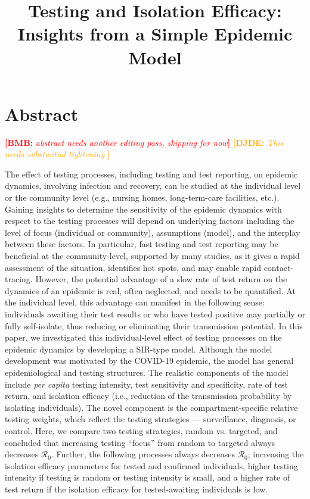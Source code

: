 \documentclass[12pt]{article}
\title{Testing and Isolation Efficacy:\\Insights from a Simple Epidemic Model}
\author{\david{??? authors ??? affiliations ???}}
\newcommand{\percap}{\emph{per capita}\xspace}
\newcommand{\Rnum}{\ensuremath{\mathcal{R}_0}\xspace}
\newcommand{\covid}{COVID-19\xspace}
\DeclareRobustCommand\_{\ifmmode\expandafter\subtxt\else\textunderscore\fi}
\newcommand{\comment}{\showcomment}
\newcommand{\showcomment}[3]{\textcolor{#1}{\textbf{[#2: }\textsl{#3}\textbf{]}}}
\newcommand{\david}[1]{\comment{orange}{DJDE}{#1}}
\newcommand{\bmb}[1]{\comment{red}{BMB}{#1}}
\theoremstyle{definition} %
\begin{document}
\maketitle

\linenumbers

\section{Abstract}

\bmb{abstract needs another editing pass, skipping for now}
\david{This needs substantial tightening.}

The effect of testing processes, including testing and test reporting, on epidemic dynamics, involving infection and recovery, can be studied at the individual level or the community level (e.g., nursing homes, long-term-care facilities, etc.).
Gaining insights to determine the sensitivity of the epidemic dynamics with respect to the testing processes will depend on underlying factors including the level of focus (individual or community), assumptions (model), and the interplay between these factors. 
In particular, fast testing and test reporting may be beneficial at the community-level, supported by many studies, as it gives a rapid assessment of the situation, identifies hot spots, and may enable rapid contact-tracing. However, the potential advantage of a slow rate of test return on the dynamics of an epidemic is real, often neglected, and needs to be quantified. At the individual level, this advantage can manifest in the following sense: individuals awaiting their test results or who have tested positive may partially or fully self-isolate, thus reducing or eliminating their transmission potential.
In this paper, we investigated this individual-level effect of testing processes on the epidemic dynamics by developing a SIR-type model.
Although the model development was motivated by the \covid epidemic, the model has general epidemiological and testing structures. The realistic components of the model include \percap testing intensity, test sensitivity and specificity, rate of test return, and isolation efficacy (i.e., reduction of the transmission probability by isolating individuals). The novel component is the compartment-specific relative testing weights, which reflect the testing strategies --- surveillance, diagnosis, or control. Here, we compare two testing strategies, random vs. targeted, and concluded that increasing testing “focus” from random to targeted always decreases \Rnum. Further, the following processes always decreases $\Rnum$; increasing the isolation efficacy parameters for tested and confirmed individuals, higher testing intensity if testing is random or testing intensity is small, and a higher rate of test return if the isolation efficacy for tested-awaiting individuals is low.
\end{document}
